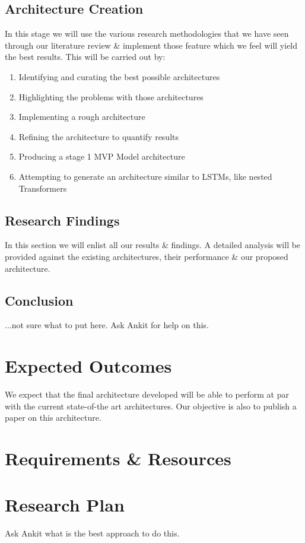 \documentclass[11pt]{article}
\begin{document}
\subsection{Architecture Creation}

In this stage we will use the various research methodologies that we have seen through our literature review \& implement those feature which we feel will yield the best results. This will be carried out by:
\begin{enumerate}
\item { Identifying and curating the best possible architectures}
\item {Highlighting the problems with those architectures}
\item { Implementing a rough architecture }
\item {Refining the architecture to quantify results}
\item { Producing a stage 1 MVP Model architecture}
\item { Attempting to generate an architecture similar to LSTMs, like nested Transformers}
\end{enumerate}
\subsection{Research Findings}

In this section we will enlist all our results \& findings. A detailed analysis will be provided against the existing architectures, their performance \& our proposed architecture.
\subsection{Conclusion}
...not sure what to put here. Ask Ankit for help on this. 
\section{Expected Outcomes}

We expect that the final architecture developed will be able to perform at par with the current state-of-the art architectures. Our objective is also to publish a paper on this architecture.
\section{Requirements \& Resources}
\section{Research Plan}
Ask Ankit what is the best approach to do this.


\end{document}
